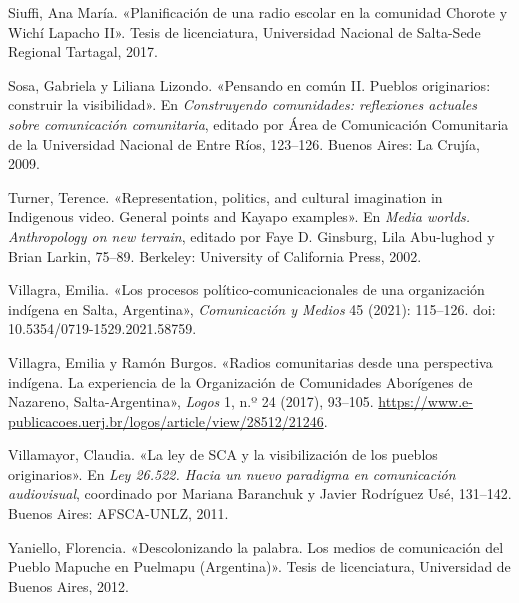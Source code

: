 \documentclass{tufte-handout}
\begin{document}
\begin{hangparas}{.25in}{1}
Siuffi, Ana María. «Planificación de una radio escolar en la comunidad
Chorote y Wichí Lapacho II». Tesis de licenciatura, Universidad Nacional
de Salta-Sede Regional Tartagal, 2017.

Sosa, Gabriela y Liliana Lizondo. «Pensando en común II. Pueblos
originarios: construir la visibilidad». En \emph{Construyendo
comunidades: reflexiones actuales sobre comunicación comunitaria},
editado por Área de Comunicación Comunitaria de la Universidad Nacional
de Entre Ríos, 123--126. Buenos Aires: La Crujía, 2009.

Turner, Terence. «Representation, politics, and cultural imagination in
Indigenous video. General points and Kayapo examples». En \emph{Media
worlds. Anthropology on new terrain}, editado por Faye D. Ginsburg, Lila
Abu-lughod y Brian Larkin, 75--89. Berkeley: University of California
Press, 2002.

Villagra, Emilia. «Los procesos político-comunicacionales de una
organización indígena en Salta, Argentina», \emph{Comunicación y Medios}
45 (2021): 115--126. doi: 10.5354/0719-1529.2021.58759.

Villagra, Emilia y Ramón Burgos. «Radios comunitarias desde una
perspectiva indígena. La experiencia de la Organización de Comunidades
Aborígenes de Nazareno, Salta-Argentina», \emph{Logos} 1, n.º 24 (2017),
93--105.
\url{https://www.e-publicacoes.uerj.br/logos/article/view/28512/21246}.

Villamayor, Claudia. «La ley de SCA y la visibilización de los pueblos
originarios». En \emph{Ley 26.522. Hacia un nuevo paradigma en
comunicación audiovisual}, coordinado por Mariana Baranchuk y Javier
Rodríguez Usé, 131--142. Buenos Aires: AFSCA-UNLZ, 2011.

Yaniello, Florencia. «Descolonizando la palabra. Los medios de
comunicación del Pueblo Mapuche en Puelmapu (Argentina)». Tesis de
licenciatura, Universidad de Buenos Aires, 2012.



\end{hangparas}
\end{document}
